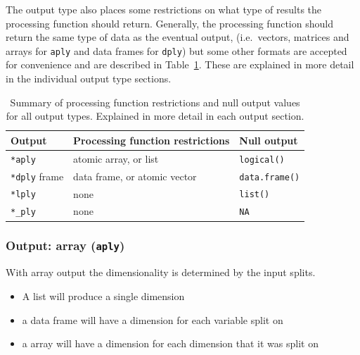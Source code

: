 \documentclass[letterpage]{scrartcl}
\newcommand{\code}[1]{\lstinline!#1!}
\newcommand{\f}[1]{\lstinline!#1()!}
\begin{document}
The output type also places some restrictions on what type of results the processing function should return.  Generally, the processing function should return the same type of data as the eventual output, (i.e.\ vectors, matrices and arrays for {\tt *aply} and data frames for {\tt *dply}) but some other formats are accepted for convenience and are described in Table~\ref{tbl:restrictions}.  These are explained in more detail in the individual output type sections.

\begin{table}
  \begin{center}
  \begin{tabular}{lll}
    \toprule
    Output & Processing function restrictions & Null output \\
    \midrule
     \code{*aply} & atomic array, or list & \f{logical} \\
     \code{*dply} frame  & data frame, or atomic vector & \f{data.frame}\\
     \code{*lply} & none & \f{list} \\
     \code{*_ply} & none & \code{NA} \\
     \bottomrule  
  \end{tabular}
  \end{center}
  \caption{Summary of processing function restrictions and null output values for all output types.  Explained in more detail in each output section. }
  \label{tbl:restrictions}
\end{table}


\subsubsection{Output: array ({\tt *aply})}

With array output the dimensionality is determined by the input splits.  

\begin{itemize}
  \item A list will produce a single dimension
  \item a data frame will have a dimension for each variable split on
  \item a array will have a dimension for each dimension that it was split on
  
\end{itemize}
\end{document}
